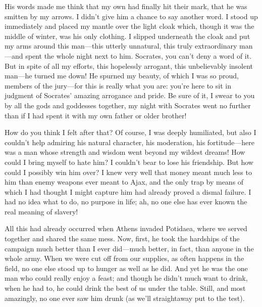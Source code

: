 His words made me think that my own had finally hit their mark, that he
was smitten by my arrows. I didn’t give him a chance to say another
word. I stood up immediately and placed my mantle over the light cloak
which, though it was the middle of winter, was his only clothing. I
slipped underneath the cloak and put my arms around this man---this
utterly  unnatural, this truly extraordinary man---and spent the
whole night next to him. Socrates, you can’t deny a word of it. But in
spite of all my efforts, this hopelessly arrogant, this unbelievably
insolent man---he turned me down! He spurned my beauty, of which I was
so proud, members of the jury---for this is really what you are: you’re
here to sit in judgment of Socrates’ amazing arrogance and pride. Be
sure of it, I swear to you by all the gods and goddesses together, my
night with Socrates went no  further than if I had spent it with
my own father or older brother!

How do you think I felt after that? Of course, I was deeply humiliated,
but also I couldn’t help admiring his natural character, his moderation,
his fortitude---here was a man whose strength and wisdom went beyond my
wildest dreams! How could I bring myself to hate him? I couldn’t bear to
lose his friendship. But how could I possibly win him over? I knew
 very well that money meant much less to him than enemy weapons
ever meant to Ajax,
and the only trap by means of which I had thought I might capture him
had already proved a dismal failure. I had no idea what to do, no
purpose in life; ah, no one else has ever known the real meaning of
slavery!

All this had already occurred when Athens invaded
Potidaea, where we
served together and shared the same mess. Now, first, he took the
hardships of the campaign much better than I ever did---much better, in
fact, than anyone in the whole army. When we were cut off from our
supplies, as often happens in the field, no one else stood up to hunger
as  well as he did. And yet he was the one man who could
really enjoy a feast; and though he didn’t much want to drink, when he
had to, he could drink the best of us under the table. Still, and most
amazingly, no one ever saw him drunk (as we’ll straightaway put to the
test).

